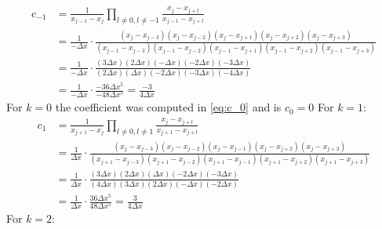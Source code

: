 \begin{equation}
	\begin{aligned}
		c_{-1} & = \frac{1}{x_{j-1} - x_j} \prod_{l \neq 0, l \neq -1} \frac{x_j - x_{j+l}}{x_{j-1} - x_{j+l}}                                                                                                                   \\
		       & = \frac{1}{-\Delta x} \cdot \frac{(x_j - x_{j-3})(x_j - x_{j-2})(x_j - x_{j+1})(x_j - x_{j+2})(x_j - x_{j+3})}{(x_{j-1} - x_{j-3})(x_{j-1} - x_{j-2})(x_{j-1} - x_{j+1})(x_{j-1} - x_{j+2})(x_{j-1} - x_{j+3})} \\
		       & = \frac{1}{-\Delta x} \cdot \frac{(3\Delta x)(2\Delta x)(-\Delta x)(-2\Delta x)(-3\Delta x)}{(2\Delta x)(\Delta x)(-2\Delta x)(-3\Delta x)(-4\Delta x)}                                                            \\
		       & = \frac{1}{-\Delta x} \cdot \frac{-36 \Delta x^5}{-48 \Delta x^5} = \frac{-3}{4\Delta x}
	\end{aligned}
\end{equation}
For $k = 0 $ the coefficient was computed in \eqref{eq:c_0} and is $c_0 = 0$\newline
For $k = 1$:
\begin{equation}
	\begin{aligned}
		c_{1} & = \frac{1}{x_{j+1} - x_j} \prod_{l \neq 0, l \neq 1} \frac{x_j - x_{j+l}}{x_{j+1} - x_{j+l}}                                                                                                                   \\
		      & = \frac{1}{\Delta x} \cdot \frac{(x_j - x_{j-3})(x_j - x_{j-2})(x_j - x_{j-1})(x_j - x_{j+2})(x_j - x_{j+3})}{(x_{j+1} - x_{j-3})(x_{j+1} - x_{j-2})(x_{j+1} - x_{j-1})(x_{j+1} - x_{j+2})(x_{j+1} - x_{j+3})} \\
		      & = \frac{1}{\Delta x} \cdot \frac{(3\Delta x)(2\Delta x)(\Delta x)(-2\Delta x)(-3\Delta x)}{(4\Delta x)(3\Delta x)(2\Delta x)(-\Delta x)(-2\Delta x)}                                                               \\
		      & =  \frac{1}{\Delta x} \cdot \frac{36 \Delta x^5}{48 \Delta x^5} = \frac{3}{4\Delta x}
	\end{aligned}
\end{equation}
For $k = 2$:
